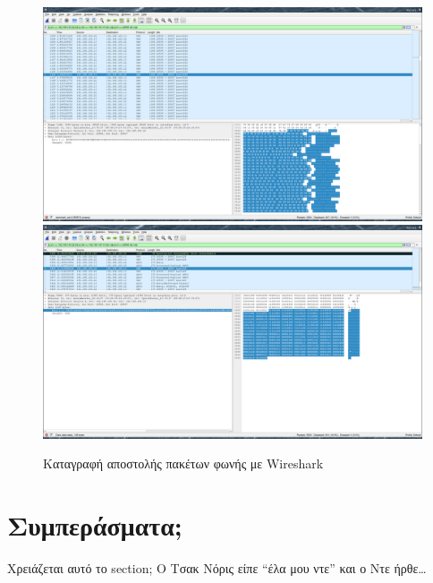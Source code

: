 \documentclass{article}
\begin{document}
\begin{figure}%
    \centering
    {\includegraphics[scale=0.1]{voice-stream.png}}
    {\includegraphics[scale=0.1]{voice-small-packets2.png}}
    \caption{Καταγραφή αποστολής πακέτων φωνής με Wireshark}
\end{figure}

\section{Συμπεράσματα;}
Χρειάζεται αυτό το section; Ο Τσακ Νόρις είπε ``έλα μου ντε'' και ο Ντε ήρθε\ldots
\end{document}
